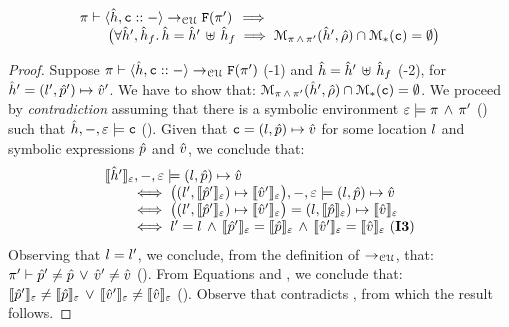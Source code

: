 \begin{lemma}\label{ca:unification:failure} 
$$
\begin{array}{l}
\cellunificationx{\sheap, \cell \lstcons -}{\uno{\pc'}}{\pc} \, \implies \, \\ 
	\qquad  \big(\forall \sheap', \sheap_f . \, \sheap = \sheap' \dunion \sheap_f \implies 
                \smodels{\sheap', \sstore}{\pc \, \wedge \, \pc'} \cap \sepmodels{\cell} = \emptyset \big)
\end{array}
$$
 \end{lemma}
 \begin{proof}
Suppose $\cellunificationx{\sheap, \cell \lstcons -}{\uno{\pc'}}{\pc}$ (\hyp{1}) and 
$\sheap = \sheap' \dunion \sheap_f$ (\hyp{2}), for $\sheap' = (\loc', \sexprp') \mapsto \sexprv'$. 
We have to show that: $\smodels{\sheap', \sstore}{\pc \, \wedge \, \pc'} \cap \sepmodels{\cell} = \emptyset$.
We proceed by \emph{contradiction} assuming that there is a symbolic environment 
$\senv \satisfies \pc \, \wedge \, \pc'$ () such that $\sheap, -, \senv \satisfies \cell$ (). 
Given that $\cell = (\loc, \sexprp) \mapsto \sexprv$ for some location $\loc$ and 
symbolic expressions $\sexprp$ and $\sexprv$, we conclude that: 
$$
\begin{array}{l}
\symbeval{\sheap'}{\senv}, -, \senv \satisfies (\loc, \sexprp) \mapsto \sexprv \\ 
\qquad \iff \big((\loc', \symbeval{\sexprp'}{\senv}) \mapsto \symbeval{\sexprv'}{\senv} \big), -, \senv \satisfies (\loc, \sexprp) \mapsto \sexprv \\ 
\qquad \iff \big((\loc', \symbeval{\sexprp'}{\senv}) \mapsto \symbeval{\sexprv'}{\senv} \big) = (\loc, \symbeval{\sexprp}{\senv}) \mapsto \symbeval{\sexprv}{\senv} \\
\qquad \iff \loc' = \loc \, \wedge \, \symbeval{\sexprp'}{\senv} = \symbeval{\sexprp}{\senv} \, \wedge \, \symbeval{\sexprv'}{\senv} = \symbeval{\sexprv}{\senv} \text{ (\ieq{3})}
\end{array}
$$
Observing that $\loc = \loc'$, we conclude, from the definition of $\rightarrow_{\cal CU}$, that: 
$\pc' \vdash \sexprp' \neq \sexprp \, \vee \, \sexprv' \neq \sexprv$ (). 
From Equations  and , we conclude that: 
$\symbeval{\sexprp'}{\senv} \neq \symbeval{\sexprp}{\senv} \, \vee \, \symbeval{\sexprv'}{\senv} \neq \symbeval{\sexprv}{\senv}$ (). 
Observe that  contradicts , from which the result follows.
\end{proof}
 

